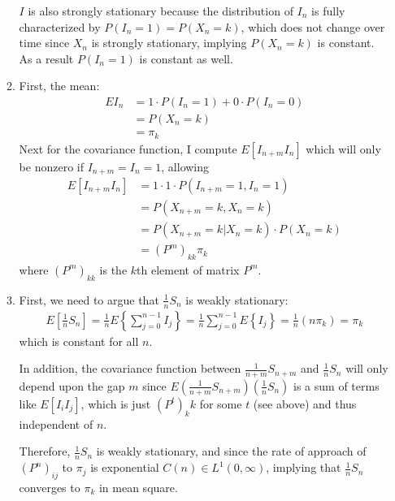 \documentclass[12pt]{article}
\theoremstyle{plain}
\theoremstyle{definition}
\theoremstyle{remark}
\begin{document}
\begin{enumerate}
\begin{enumerate}
        $I$ is also strongly stationary because the distribution of
        $I_n$ is fully characterized by $P(I_n=1)=P(X_n=k)$, which does
        not change over time since $X_n$ is strongly stationary,
        implying $P(X_n=k)$ is constant. As a result $P(I_n=1)$ is
        constant as well.

      \item %
        First, the mean:
        \begin{align*}
          EI_n &= 1\cdot P(I_n=1) + 0\cdot P(I_n=0)\\
          &= P(X_n=k)\\
          &= \pi_k
        \end{align*}
        Next for the covariance function, I compute $E[I_{n+m}I_n]$
        which will only be nonzero if $I_{n+m}=I_n=1$, allowing
        \begin{align*}
          E[I_{n+m}I_n] &= 1 \cdot 1\cdot P(I_{n+m}=1, I_n=1)\\
          &= P(X_{n+m}=k , X_n=k)\\
          &= P(X_{n+m}=k | X_n=k)\cdot P(X_n=k)\\
          &= (P^m)_{kk}  \pi_k
        \end{align*}
        where $(P^m)_{kk}$ is the $k$th element of matrix $P^m$.

      \item %
        First, we need to argue that $\frac{1}{n}S_n$ is weakly stationary:
        \begin{align*}
          E\left[\frac{1}{n}S_n\right] = \frac{1}{n}E\left\{\sum^{n-1}_{j=0}I_j\right\}
            = \frac{1}{n}\sum^{n-1}_{j=0}E\left\{I_j\right\}
            = \frac{1}{n} (n \pi_k) = \pi_k
        \end{align*}
        which is constant for all $n$.

        In addition, the covariance function between
        $\frac{1}{n+m}S_{n+m}$ and $\frac{1}{n}S_n$ will only depend
        upon the gap $m$ since
        $E\left(\frac{1}{n+m}S_{n+m}\right)\left(\frac{1}{n}S_n\right)$
        is a sum of terms like $E[I_iI_j]$, which is just $(P^t)_kk$ for
        some $t$ (see above) and thus independent of $n$.

        Therefore, $\frac{1}{n}S_n$ is weakly stationary, and since the
        rate of approach of $(P^n)_{ij}$ to $\pi_j$ is exponential
        $C(n)\in L^1(0,\infty)$, implying that $\frac{1}{n}S_n$
        converges to $\pi_k$ in mean square.


\end{enumerate}
\end{enumerate}
\end{document}
